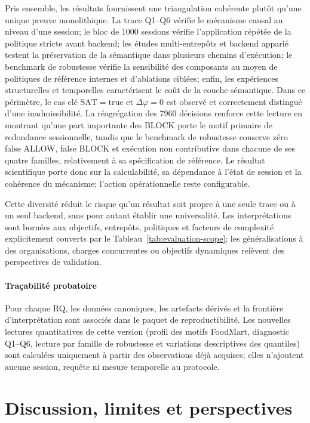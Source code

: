 \documentclass[journal]{IEEEtran}
\begin{document}
Pris ensemble, les résultats fournissent une triangulation cohérente plutôt qu'une unique preuve monolithique. La trace Q1--Q6 vérifie le mécanisme causal au niveau d'une session; le bloc de 1000 sessions vérifie l'application répétée de la politique stricte avant backend; les études multi-entrepôts et backend apparié testent la préservation de la sémantique dans plusieurs chemins d'exécution; le benchmark de robustesse vérifie la sensibilité des composants au moyen de politiques de référence internes et d'ablations ciblées; enfin, les expériences structurelles et temporelles caractérisent le coût de la couche sémantique. Dans ce périmètre, le cas clé $\mathrm{SAT}=\mathrm{true}$ et $\Delta\varphi=0$ est observé et correctement distingué d'une inadmissibilité. La réagrégation des 7960 décisions renforce cette lecture en montrant qu'une part importante des BLOCK porte le motif primaire de redondance sessionnelle, tandis que le benchmark de robustesse conserve zéro false ALLOW, false BLOCK et exécution non contributive dans chacune de ses quatre familles, relativement à sa spécification de référence. Le résultat scientifique porte donc sur la calculabilité, sa dépendance à l'état de session et la cohérence du mécanisme; l'action opérationnelle reste configurable.

Cette diversité réduit le risque qu'un résultat soit propre à une seule trace ou à un seul backend, sans pour autant établir une universalité. Les interprétations sont bornées aux objectifs, entrepôts, politiques et facteurs de complexité explicitement couverts par le Tableau~\ref{tab:evaluation-scope}; les généralisations à des organisations, charges concurrentes ou objectifs dynamiques relèvent des perspectives de validation.

\paragraph*{Traçabilité probatoire} Pour chaque RQ, les données canoniques, les artefacts dérivés et la frontière d'interprétation sont associés dans le paquet de reproductibilité. Les nouvelles lectures quantitatives de cette version (profil des motifs FoodMart, diagnostic Q1--Q6, lecture par famille de robustesse et variations descriptives des quantiles) sont calculées uniquement à partir des observations déjà acquises; elles n'ajoutent aucune session, requête ni mesure temporelle au protocole.


\section{Discussion, limites et perspectives}
\label{sec:discussion}
\end{document}

